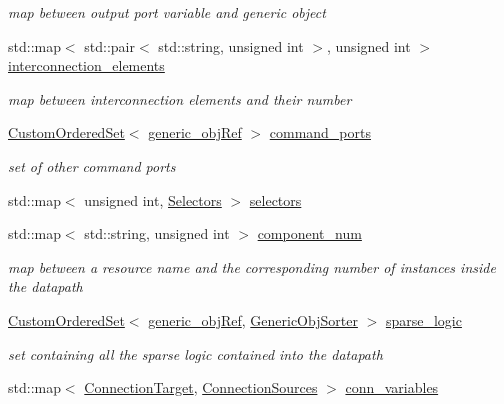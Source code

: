 \begin{DoxyCompactItemize}
\begin{DoxyCompactList}\small\item\em map between output port variable and generic object \end{DoxyCompactList}\item 
std\+::map$<$ std\+::pair$<$ std\+::string, unsigned int $>$, unsigned int $>$ \hyperlink{classconn__binding_a19b042a73e19efd030ac8d76527dea10}{interconnection\+\_\+elements}
\begin{DoxyCompactList}\small\item\em map between interconnection elements and their number \end{DoxyCompactList}\item 
\hyperlink{classCustomOrderedSet}{Custom\+Ordered\+Set}$<$ \hyperlink{generic__obj_8hpp_acb533b2ef8e0fe72e09a04d20904ca81}{generic\+\_\+obj\+Ref} $>$ \hyperlink{classconn__binding_a87dd4f0563999fbb03571769db2372ba}{command\+\_\+ports}
\begin{DoxyCompactList}\small\item\em set of other command ports \end{DoxyCompactList}\item 
std\+::map$<$ unsigned int, \hyperlink{classconn__binding_a1994d72baf506bcb1d94e0cfede4258b}{Selectors} $>$ \hyperlink{classconn__binding_afeb17985cbcc1739c90e5428700aecfb}{selectors}
\item 
std\+::map$<$ std\+::string, unsigned int $>$ \hyperlink{classconn__binding_a9bda1f1b0572a64f1f47e32079bbfb36}{component\+\_\+num}
\begin{DoxyCompactList}\small\item\em map between a resource name and the corresponding number of instances inside the datapath \end{DoxyCompactList}\item 
\hyperlink{classCustomOrderedSet}{Custom\+Ordered\+Set}$<$ \hyperlink{generic__obj_8hpp_acb533b2ef8e0fe72e09a04d20904ca81}{generic\+\_\+obj\+Ref}, \hyperlink{classGenericObjSorter}{Generic\+Obj\+Sorter} $>$ \hyperlink{classconn__binding_a6f2b90952b7cb790fe4fabe7399ea90c}{sparse\+\_\+logic}
\begin{DoxyCompactList}\small\item\em set containing all the sparse logic contained into the datapath \end{DoxyCompactList}\item 
std\+::map$<$ \hyperlink{structconn__binding_1_1ConnectionTarget}{Connection\+Target}, \hyperlink{classconn__binding_aa5406c3bf4cee893234c2b0847471f56}{Connection\+Sources} $>$ \hyperlink{classconn__binding_a898c3972aa4e06c44a5154132e476471}{conn\+\_\+variables}

\end{DoxyCompactItemize}
